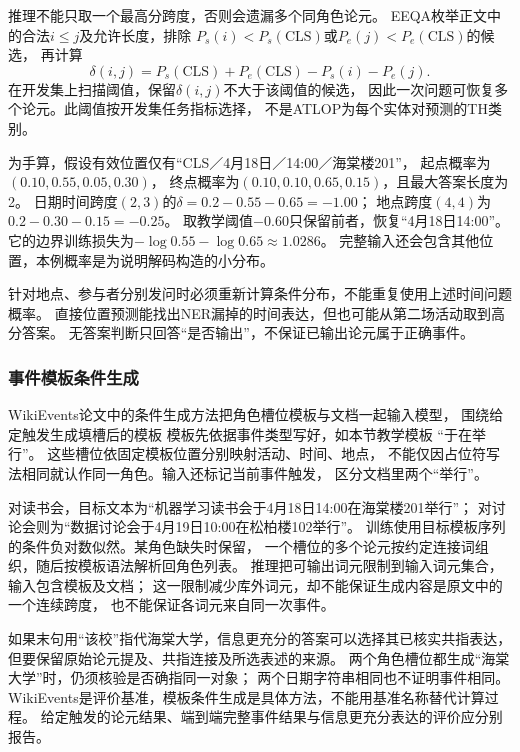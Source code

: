 推理不能只取一个最高分跨度，否则会遗漏多个同角色论元。
EEQA枚举正文中的合法$i\leq j$及允许长度，排除
$P_s(i)<P_s(\mathrm{CLS})$或$P_e(j)<P_e(\mathrm{CLS})$的候选，
再计算
\begin{equation}
  \delta(i,j)=P_s(\mathrm{CLS})+P_e(\mathrm{CLS})-P_s(i)-P_e(j).
  \label{eq:nlp-extraction-eeqa-threshold}
\end{equation}
在开发集上扫描阈值，保留$\delta(i,j)$不大于该阈值的候选，
因此一次问题可恢复多个论元。此阈值按开发集任务指标选择，
不是ATLOP为每个实体对预测的TH类别。

为手算，假设有效位置仅有“CLS／4月18日／14:00／海棠楼201”，
起点概率为$(0.10,0.55,0.05,0.30)$，
终点概率为$(0.10,0.10,0.65,0.15)$，且最大答案长度为2。
日期时间跨度$(2,3)$的$\delta=0.2-0.55-0.65=-1.00$；
地点跨度$(4,4)$为$0.2-0.30-0.15=-0.25$。
取教学阈值$-0.60$只保留前者，恢复“4月18日14:00”。
它的边界训练损失为$-\log0.55-\log0.65\approx1.0286$。
完整输入还会包含其他位置，本例概率是为说明解码构造的小分布。

针对地点、参与者分别发问时必须重新计算条件分布，不能重复使用上述时间问题概率。
直接位置预测能找出NER漏掉的时间表达，但也可能从第二场活动取到高分答案。
无答案判断只回答“是否输出”，不保证已输出论元属于正确事件。

\subsubsection{事件模板条件生成}
\label{sec:nlp-extraction-event-template}

WikiEvents论文中的条件生成方法把角色槽位模板与文档一起输入模型，
围绕给定触发生成填槽后的模板
模板先依据事件类型写好，如本节教学模板
“于在举行”。
这些槽位依固定模板位置分别映射活动、时间、地点，
不能仅因占位符写法相同就认作同一角色。输入还标记当前事件触发，
区分文档里两个“举行”。

对读书会，目标文本为“机器学习读书会于4月18日14:00在海棠楼201举行”；
对讨论会则为“数据讨论会于4月19日10:00在松柏楼102举行”。
训练使用目标模板序列的条件负对数似然。某角色缺失时保留，
一个槽位的多个论元按约定连接词组织，随后按模板语法解析回角色列表。
推理把可输出词元限制到输入词元集合，输入包含模板及文档；
这一限制减少库外词元，却不能保证生成内容是原文中的一个连续跨度，
也不能保证各词元来自同一次事件。

如果末句用“该校”指代海棠大学，信息更充分的答案可以选择其已核实共指表达，
但要保留原始论元提及、共指连接及所选表述的来源。
两个角色槽位都生成“海棠大学”时，仍须核验是否确指同一对象；
两个日期字符串相同也不证明事件相同。
WikiEvents是评价基准，模板条件生成是具体方法，不能用基准名称替代计算过程。
给定触发的论元结果、端到端完整事件结果与信息更充分表达的评价应分别报告。

